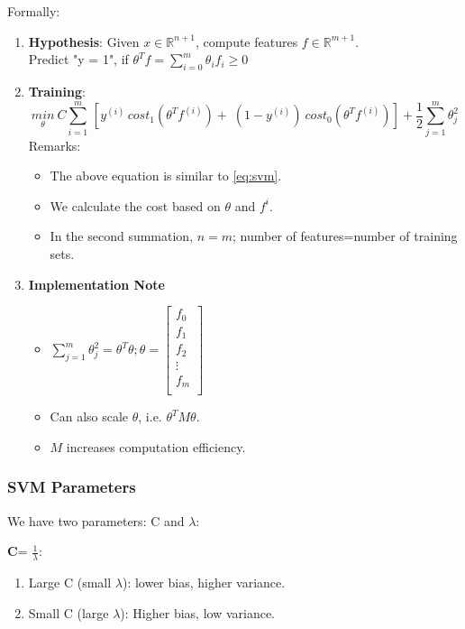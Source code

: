         Formally:
        \begin{enumerate}
            \item \textbf{Hypothesis}: Given $x \in \mathbb{R}^{n+1}$, compute features $f \in \mathbb{R}^{m+1}$. \\
                Predict "y = 1", if $\theta^T f  = \sum_{i=0}^{m} \theta_i f_i \geq 0$
            \item \textbf{Training}: 
                \[
        \underset{\theta}{min}\: C \sum_{i=1}^{m}\, [ y^{(i)}\, cost_1 (\theta^T f^{(i)}) + \; (1-y^{(i)})\:cost_0 (\theta^T f^{(i)})] + \frac{1}{2} \sum_{j=1}^{m} \theta_j^2
            \] 
                Remarks: 
                \begin{itemize}
                    \item The above equation is similar to \ref{eq:svm}.
                    \item We calculate the cost based on $\theta$ and $f^{i}$.
                    \item In the second summation, $n=m$; number of features=number of training sets.
                \end{itemize}
            \item \textbf{Implementation Note}
                \begin{itemize}
                    \item $\sum_{j=1}^{m} \theta_j^2 = \theta^T \theta; 
                            \theta = \begin{bmatrix}
                            f_0     \\
                            f_1     \\
                            f_2     \\
                            \vdots  \\
                            f_m     \\
                                    \end{bmatrix}$ 
                    \item Can also scale $\theta$, i.e. $\theta^T M \theta$.
                    \item $M$ increases computation efficiency.
                \end{itemize}
        \end{enumerate}

        
    \subsubsection{SVM Parameters}
    We have two parameters: C and $\lambda$: \\
    \par \textbf{C}= $\frac{1}{\lambda}$:
    \begin{enumerate}
        \item Large C (small $\lambda$): lower bias, higher variance.
        \item Small C (large $\lambda$): Higher bias, low variance.
    \end{enumerate}

